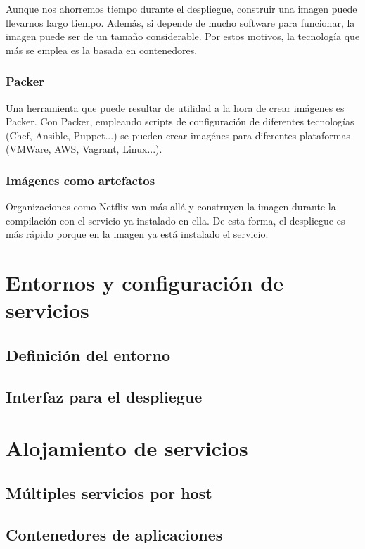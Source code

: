 \documentclass[11pt,a4paper]{article}
\begin{document}
Aunque nos ahorremos tiempo durante el despliegue, construir una imagen puede llevarnos largo tiempo. Además, si depende de mucho software para funcionar, la imagen puede ser de un tamaño considerable. Por estos motivos, la tecnología que más se emplea es la basada en contenedores.

\subsubsection{Packer}

Una herramienta que puede resultar de utilidad a la hora de crear imágenes es Packer. Con Packer, empleando scripts de configuración de diferentes tecnologías (Chef, Ansible, Puppet...) se pueden crear imagénes para diferentes plataformas (VMWare, AWS, Vagrant, Linux...).

\subsubsection{Imágenes como artefactos}

Organizaciones como Netflix van más allá y construyen la imagen durante la compilación con el servicio ya instalado en ella. De esta forma, el despliegue es más rápido porque en la imagen ya está instalado el servicio.

\section{Entornos y configuración de servicios}

\subsection{Definición del entorno}

\subsection{Interfaz para el despliegue}

\section{Alojamiento de servicios}

\subsection{Múltiples servicios por host}

\subsection{Contenedores de aplicaciones}
\end{document}
